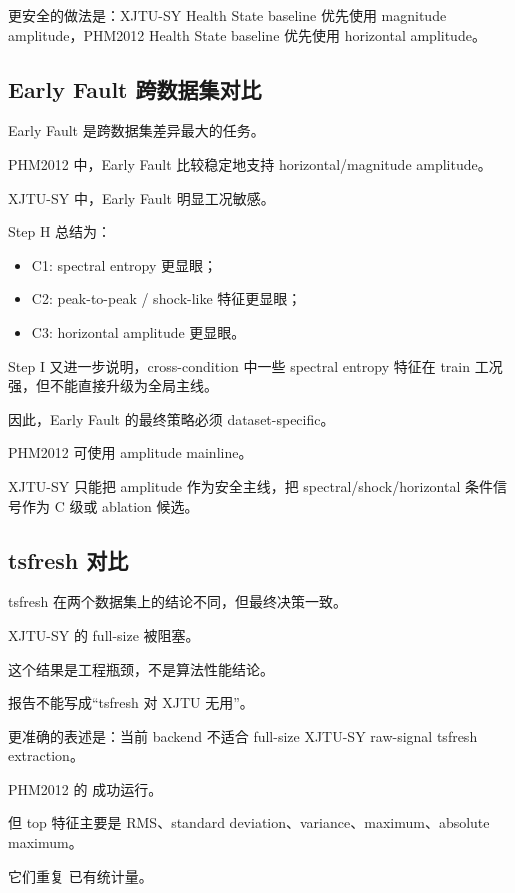 更安全的做法是：XJTU-SY Health State baseline 优先使用 magnitude amplitude，PHM2012 Health State baseline 优先使用 horizontal amplitude。

\subsection{Early Fault 跨数据集对比}

Early Fault 是跨数据集差异最大的任务。

PHM2012 中，Early Fault 比较稳定地支持 horizontal/magnitude amplitude。

XJTU-SY 中，Early Fault 明显工况敏感。

Step H 总结为：

\begin{itemize}[leftmargin=2em]
  \item C1: spectral entropy 更显眼；
  \item C2: peak-to-peak / shock-like 特征更显眼；
  \item C3: horizontal amplitude 更显眼。
\end{itemize}

Step I 又进一步说明，cross-condition 中一些 spectral entropy 特征在 train 工况强，但不能直接升级为全局主线。

因此，Early Fault 的最终策略必须 dataset-specific。

PHM2012 可使用 amplitude mainline。

XJTU-SY 只能把 amplitude 作为安全主线，把 spectral/shock/horizontal 条件信号作为 C 级或 ablation 候选。

\subsection{tsfresh 对比}

tsfresh 在两个数据集上的结论不同，但最终决策一致。

XJTU-SY 的 full-size  被阻塞。

这个结果是工程瓶颈，不是算法性能结论。

报告不能写成“tsfresh 对 XJTU 无用”。

更准确的表述是：当前 backend 不适合 full-size XJTU-SY raw-signal tsfresh extraction。

PHM2012 的  成功运行。

但 top  特征主要是 RMS、standard deviation、variance、maximum、absolute maximum。

它们重复  已有统计量。

